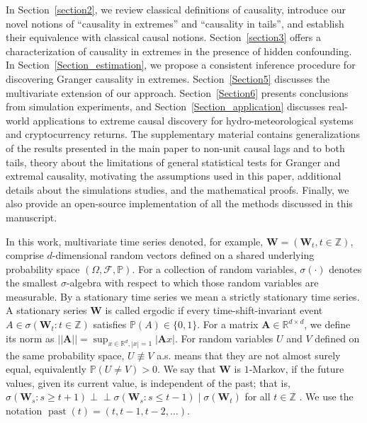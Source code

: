 \documentclass[a4paper,11pt]{article}
\DeclareMathOperator{\past}{past}
\newcommand{\citesupplement}{}
\begin{document}
In Section~\ref{section2}, we review classical definitions of causality, introduce our novel notions of ``causality in extremes'' and ``causality in tails'', and establish their equivalence with classical causal notions. Section~\ref{section3} offers a characterization of causality in extremes in the presence of hidden confounding. 
In Section~\ref{Section_estimation}, we propose a consistent inference procedure for discovering Granger causality in extremes.
Section~\ref{Section5} discusses the multivariate extension of our approach. 
Section~\ref{Section6} presents conclusions from simulation experiments, and Section~\ref{Section_application} discusses real-world applications to extreme causal discovery for hydro-meteorological systems and cryptocurrency returns. 
The supplementary material \citesupplement contains generalizations of the results presented in the main paper to non-unit causal lags and to both tails, theory about the limitations of general statistical tests for Granger and extremal causality, motivating the assumptions used in this paper, additional details about the simulations studies, and the mathematical proofs. 
Finally, we also provide an open-source implementation of all the methods discussed in this manuscript.

In this work, multivariate time series denoted, for example, $\mathbf{W} = (\mathbf{W}_t, t\in\mathbb{Z})$, comprise $d$-dimensional random vectors defined on a shared underlying probability space $(\Omega,\mathcal{F},\mathbb{P})$. For a collection of random variables, $\sigma(\cdot)$ denotes the smallest $\sigma$-algebra with respect to which those random variables are measurable. By a stationary time series we mean a strictly
stationary time series. A stationary series \(\mathbf W\) is called
ergodic if every time-shift-invariant event
\(A\in\sigma(\mathbf W_t:t\in\mathbb Z)\) satisfies \(
\mathbb P(A)\in\{0,1\}.
\) For a matrix $\textbf{A}\in\mathbb{R}^{d\times d}$, we define its norm as  $||\textbf{A}|| = \sup_{x\in\mathbb{R}^d, |x|=1}|\textbf{A}x|$. For random variables \(U\) and \(V\) defined on the same probability space, \(U \not\equiv V\) a.s. means that they are not
almost surely equal, equivalently \(\mathbb P(U\neq V)>0\). We say that $\textbf{W}$ is $1$-Markov, if the future values, given its current value, is independent of the past; that is, $\sigma(\mathbf W_s:s\ge t+1)
\perp\!\!\!\perp
\sigma(\mathbf W_s:s\le t-1)
\mid
\sigma(\mathbf W_t)$ for all $t\in\mathbb{Z}$ \citep{Markov_processes}. We use the notation $\past(t) = (t, t-1, t-2, \dots)$. 
\end{document}
